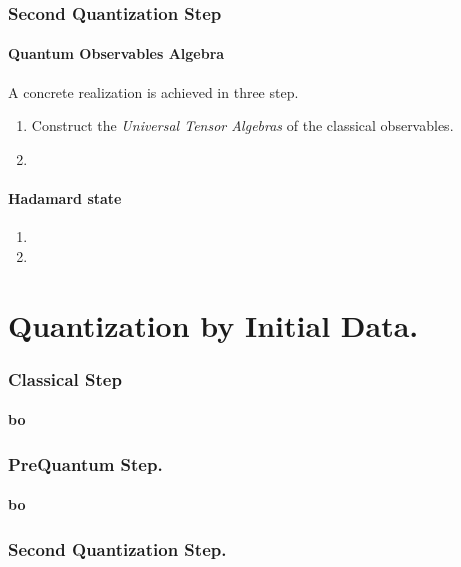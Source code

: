 \documentclass[Main]{subfiles}
\begin{document}
   		  		
	\subsubsection{Second Quantization Step}%
		\paragraph{Quantum Observables Algebra}   		
		A concrete realization is achieved in three step.
   					\begin{enumerate}
   						\item Construct the \emph{Universal Tensor Algebras} of the classical observables.
   						\item
   					\end{enumerate}
   					
   		\paragraph{Hadamard state} 
   				   	\begin{enumerate}
   						\item
   						\item
   					\end{enumerate}

\section{Quantization by Initial Data.}
	\subsubsection{Classical Step}
		\paragraph{bo}
	
	\subsubsection{PreQuantum Step.}
		\paragraph{bo}

	\subsubsection{Second Quantization Step.}
		
\end{document}
